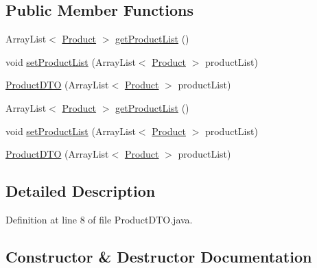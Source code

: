 \subsection*{Public Member Functions}
\begin{DoxyCompactItemize}
\item 
Array\+List$<$ \mbox{\hyperlink{class_s_p_q_1_1data_1_1_product}{Product}} $>$ \mbox{\hyperlink{class_s_p_q_1_1dto_1_1_product_d_t_o_a4b7df5983f4342285d495a335fb9019f}{get\+Product\+List}} ()
\item 
void \mbox{\hyperlink{class_s_p_q_1_1dto_1_1_product_d_t_o_a79be4bcc432ec5c17c5873e868aa2e4f}{set\+Product\+List}} (Array\+List$<$ \mbox{\hyperlink{class_s_p_q_1_1data_1_1_product}{Product}} $>$ product\+List)
\item 
\mbox{\hyperlink{class_s_p_q_1_1dto_1_1_product_d_t_o_a206290d64e728a8838485f958bee2c29}{Product\+D\+TO}} (Array\+List$<$ \mbox{\hyperlink{class_s_p_q_1_1data_1_1_product}{Product}} $>$ product\+List)
\item 
Array\+List$<$ \mbox{\hyperlink{class_s_p_q_1_1data_1_1_product}{Product}} $>$ \mbox{\hyperlink{class_s_p_q_1_1dto_1_1_product_d_t_o_a4b7df5983f4342285d495a335fb9019f}{get\+Product\+List}} ()
\item 
void \mbox{\hyperlink{class_s_p_q_1_1dto_1_1_product_d_t_o_a79be4bcc432ec5c17c5873e868aa2e4f}{set\+Product\+List}} (Array\+List$<$ \mbox{\hyperlink{class_s_p_q_1_1data_1_1_product}{Product}} $>$ product\+List)
\item 
\mbox{\hyperlink{class_s_p_q_1_1dto_1_1_product_d_t_o_a206290d64e728a8838485f958bee2c29}{Product\+D\+TO}} (Array\+List$<$ \mbox{\hyperlink{class_s_p_q_1_1data_1_1_product}{Product}} $>$ product\+List)
\end{DoxyCompactItemize}


\subsection{Detailed Description}


Definition at line 8 of file Product\+D\+T\+O.\+java.



\subsection{Constructor \& Destructor Documentation}
\mbox{\label{class_s_p_q_1_1dto_1_1_product_d_t_o_a206290d64e728a8838485f958bee2c29}} 
